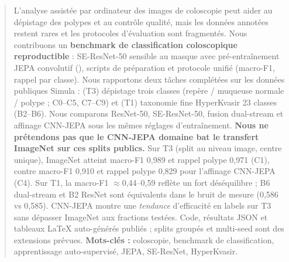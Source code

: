 \begin{abstract}
L'analyse assistée par ordinateur des images de coloscopie peut aider au dépistage des polypes et au contrôle qualité, mais les données annotées restent rares et les protocoles d'évaluation sont fragmentés.
Nous contribuons un \textbf{benchmark de classification coloscopique reproductible} : SE-ResNet-50 sensible au masque avec pré-entraînement JEPA convolutif (\method{}), scripts de préparation et protocole unifié (macro-F1, rappel par classe).
Nous rapportons deux tâches complétées sur les données publiques Simula : (T3) dépistage trois classes (repère / muqueuse normale / polype ; C0--C5, C7--C9) et (T1) taxonomie fine HyperKvasir 23 classes (B2--B6).
Nous comparons ResNet-50, SE-ResNet-50, fusion dual-stream et affinage CNN-JEPA sous les mêmes réglages d'entraînement.
\textbf{Nous ne prétendons pas que le CNN-JEPA domaine bat le transfert ImageNet sur ces splits publics.}
Sur T3 (split au niveau image, centre unique), ImageNet atteint macro-F1 0,989 et rappel polype 0,971 (C1), contre macro-F1 0,910 et rappel polype 0,829 pour l'affinage CNN-JEPA (C4).
Sur T1, la macro-F1 $\approx$0,44--0,59 reflète un fort déséquilibre ; B6 dual-stream et B2 ResNet sont équivalents dans le bruit de mesure (0,586 vs 0,585).
CNN-JEPA montre une \emph{tendance} d'efficacité en labels sur T3 sans dépasser ImageNet aux fractions testées.
Code, résultats JSON et tableaux LaTeX auto-générés publiés ; splits groupés et multi-seed sont des extensions prévues.
\textbf{Mots-clés :} coloscopie, benchmark de classification, apprentissage auto-supervisé, JEPA, SE-ResNet, HyperKvasir.
\end{abstract}

